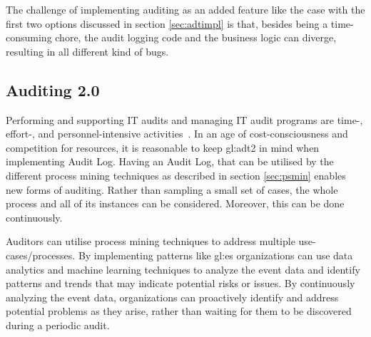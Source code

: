 The challenge of implementing auditing as an added feature like the case with the first two options discussed in section \ref{sec:adtimpl} is that, besides being a time-consuming chore, the audit logging code and the business logic can diverge, resulting in all different kind of bugs.

\subsection{Auditing 2.0}\label{sec:adt2sa}

Performing and supporting IT audits and managing IT audit programs are time-, effort-, and personnel-intensive activities~\citep{GANTZ20141-T}. In an age of cost-consciousness and competition for resources, it is reasonable to keep \gls{gl:adt2} in mind when implementing Audit Log. Having an Audit Log, that can be utilised by the different process mining techniques as described in section \ref{sec:psmin} enables new forms of auditing. Rather than sampling a small set of cases, the whole process and all of its instances can be considered. Moreover, this can be done continuously.

Auditors can utilise process mining techniques to address multiple use-cases/processes. By implementing patterns like \gls{gl:es} organizations can use data analytics and machine learning techniques to analyze the event data and identify patterns and trends that may indicate potential risks or issues. By continuously analyzing the event data, organizations can proactively identify and address potential problems as they arise, rather than waiting for them to be discovered during a periodic audit.